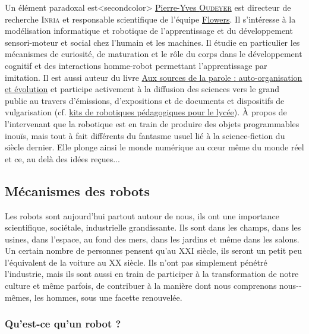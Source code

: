Un élément paradoxal est\caution[t]<secondcolor>{%
\href{http://www.pyoudeyer.com/}{Pierre-Yves \textsc{Oudeyer}} est directeur de recherche \textsc{Inria} et responsable scientifique de l’équipe \href{https://flowers.inria.fr/}{Flowers}. Il s’intéres\-se à la modélisation informatique et robotique de l’apprentissage et du développement sensori-moteur et social chez l’humain et les machines. Il étudie en particulier les mécanismes de curiosité, de  maturation et le rôle du corps dans le développement cognitif et des interac\-tions homme-robot permettant l’apprentissage par imitation. Il est aussi auteur du livre \href{http://www.pyoudeyer.com/aux-sources-de-la-parole/}{Aux sources de la parole : auto-organisation et évolution} et participe activement à la diffusion des sciences vers le grand public au travers d'émissions, d'expositions et de documents et dispositifs de vulgarisation (cf. \href{https://www.poppy-education.org/}{kits de robotiques pédagogiques pour le lycée}).
}{À propos de l'intervenant}
 que la robotique est en train de produire des objets programmables inouïs, mais tout à fait différents du fantasme usuel lié à la science-fiction du siècle dernier. Elle plonge ainsi le monde numérique au cœur même du monde réel et ce, au delà des idées reçues...


\subsection[Mécanismes des robots]{Mécanismes des robots}
\label{sub:III.2.1}

Les robots sont aujourd'hui partout autour de nous, ils ont une importance scientifique, sociétale, industrielle grandissante. Ils sont dans les champs, dans les usines, dans l'espace, au fond des mers, dans les jardins et même dans les salons. Un certain nombre de personnes pensent qu'au XXI siècle, ils seront un petit peu l'équivalent de la voiture au XX siècle. Ils n'ont pas simplement pénétré l'industrie, mais ils sont aussi en train de participer à la transformation de notre culture et même parfois, de contribuer à la manière dont nous comprenons nous-­mêmes, les hommes, sous une facette renouvelée. 

\subsubsection[Qu'est-ce qu'un robot ?]{Qu'est-ce qu'un robot ?}
\label{subsub:III.2.1.1}


